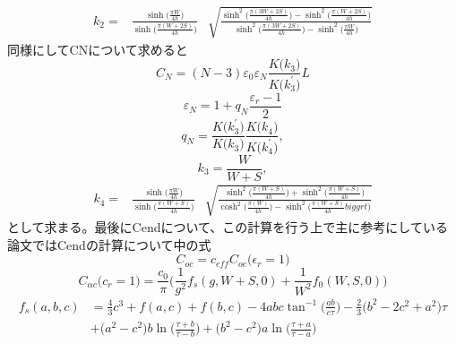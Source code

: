 \begin{equation}
    \begin{aligned}
    k_{2}=& \frac{\sinh \biggl(\frac{\pi W}{4 h}\biggr)}{\sinh \biggl(\frac{\pi(W+2 S)}{4 h}\biggr)} 
    & \sqrt{\frac{\sinh ^{2}\biggl(\frac{\pi(3 W+2 S)}{4 h}\biggr)-\sinh ^{2}\biggl(\frac{\pi(W+2 S)}{4 h}\biggr)}{\sinh ^{2}\biggl(\frac{\pi(3 W+2 S)}{4 h}\biggr)-\sinh ^{2}\biggl(\frac{\pi W}{4 h}\biggr)}}
    \end{aligned}
\end{equation}
同様にしてCNについて求めると
\begin{equation}
    C_{N}=(N-3) \varepsilon_{0} \varepsilon_{N} \frac{K\biggl(k_{3}\biggr)}{K\biggl(k_{3}^{\prime}\biggr)} L
\end{equation}
\begin{equation}
    \varepsilon_{N}=1+q_{N} \frac{\varepsilon_{r}-1}{2}
\end{equation}
\begin{equation}
    q_{N}=\frac{K\biggl(k_{3}^{\prime}\biggr)}{K\biggl(k_{3}\biggr)} \frac{K\biggl(k_{4}\biggr)}{K\biggl(k_{4}^{\prime}\biggr)},
\end{equation}
\begin{equation}
    k_{3}=\frac{W}{W+S},
\end{equation}
\begin{equation}
    \begin{aligned}
    k_{4}=& \frac{\sinh \biggl(\frac{\pi W}{4 h}\biggr)}{\sinh \biggl(\frac{\pi(W+ S)}{4 h}\biggr)} 
    & \sqrt{\frac{\sinh ^{2}\biggl(\frac{\pi(W+S)}{4 h}\biggr)+\sinh ^{2}\biggl(\frac{\pi(W+ S)}{4 h}\biggr)}{\cosh ^{2}\biggl(\frac{\pi(W)}{4 h}\biggr)-\sinh ^{2}\biggl(\frac{\pi (W+S)}{4 h}biggrt)}}
    \end{aligned}
\end{equation}
として求まる。最後にCendについて、この計算を行う上で主に参考にしている論文\cite*{Dib2005}ではCendの計算について\cite*{Dib2001ComprehensiveSO}中の式
\begin{equation}
    C_{o c}=c_{e f f} C_{o e}\biggl(\epsilon_{r}=1\biggr)
\end{equation}
\begin{equation}
    \label{Cend}
    C_{\alpha c}\biggl(c_{r}=1\biggr)=\frac{c_{0}}{\pi}\biggl(\frac{1}{g^{2}} f_{s}(g, W+S, 0)+\frac{1}{W^{2}} f_{0}(W, S, 0)\biggr)
\end{equation}
\begin{equation}
    \label{fs}
    \begin{aligned}
    f_{s}(a, b, c) &=\frac{4}{3} c^{3}+f(a, c)+f(b, c)-4 a b c \tan ^{-1}\biggl(\frac{a b}{c \tau}\biggr)-\frac{2}{3}\biggl(b^{2}-2 c^{2}+a^{2}\biggr) \tau \\
    &+\biggl(a^{2}-c^{2}\biggr) b \ln \biggl(\frac{\tau+b}{\tau-b}\biggr)+\biggl(b^{2}-c^{2}\biggr) a \ln \biggl(\frac{\tau+a}{\tau-a}\biggr)
    \end{aligned}
\end{equation}
